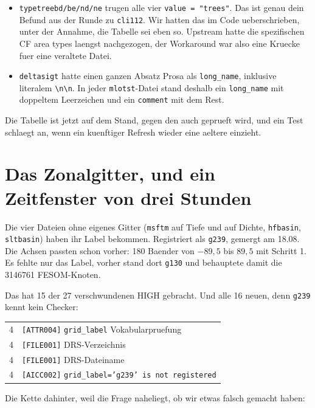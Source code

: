 \documentclass[11pt,a4paper]{article}
\newcommand{\code}[1]{\texttt{\small #1}}
\begin{document}
\begin{itemize}
\item \code{typetreebd/be/nd/ne} trugen alle vier \code{value = "trees"}. Das ist
  genau dein Befund aus der Runde zu \code{cli112}. Wir hatten das im Code
  ueberschrieben, unter der Annahme, die Tabelle sei eben so. Upstream hatte die
  spezifischen CF area types laengst nachgezogen, der Workaround war also eine
  Kruecke fuer eine veraltete Datei.
\item \code{deltasigt} hatte einen ganzen Absatz Prosa als \code{long\_name},
  inklusive literalem \verb|\n\n|. In jeder \code{mlotst}-Datei stand deshalb ein
  \code{long\_name} mit doppeltem Leerzeichen und ein \code{comment} mit dem Rest.
\end{itemize}

Die Tabelle ist jetzt auf dem Stand, gegen den auch geprueft wird, und ein Test
schlaegt an, wenn ein kuenftiger Refresh wieder eine aeltere einzieht.

\section{Das Zonalgitter, und ein Zeitfenster von drei Stunden}

Die vier Dateien ohne eigenes Gitter (\code{msftm} auf Tiefe und auf Dichte,
\code{hfbasin}, \code{sltbasin}) haben ihr Label bekommen. Registriert als
\code{g239}, gemergt am 18.08. Die Achsen passten schon vorher: 180 Baender von
$-89{,}5$ bis $89{,}5$ mit Schritt 1. Es fehlte nur das Label, vorher stand dort
\code{g130} und behauptete damit die 3146761 FESOM-Knoten.

Das hat 15 der 27 verschwundenen HIGH gebracht. Und alle 16 neuen, denn
\code{g239} kennt kein Checker:

\begin{center}
\begin{tabular}{rl}
\toprule
4 & \code{[ATTR004]} \code{grid\_label} Vokabularpruefung \\
4 & \code{[FILE001]} DRS-Verzeichnis \\
4 & \code{[FILE001]} DRS-Dateiname \\
4 & \code{[AICC002]} \code{grid\_label='g239' is not registered} \\
\bottomrule
\end{tabular}
\end{center}

Die Kette dahinter, weil die Frage naheliegt, ob wir etwas falsch gemacht haben:
\end{document}
